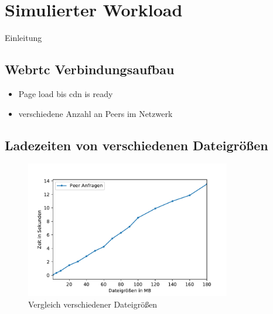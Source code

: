 %



\section{Simulierter Workload}

Einleitung 
\subsection{Webrtc Verbindungsaufbau}

\begin{itemize}
	\item Page load bis cdn is ready
	\item verschiedene Anzahl an Peers im Netzwerk 
\end{itemize}

\subsection{Ladezeiten von verschiedenen Dateigrößen}
\begin{figure}[!h]
	\centering
	\includegraphics[width=0.8\textwidth]{figures/Timing_file_size}
	\caption[A Figure Short-Title]{Vergleich verschiedener Dateigrößen}
	\label{fig:timing_file_size}
\end{figure}

